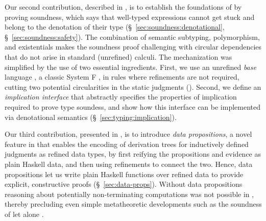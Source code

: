 %
Our second contribution,
described in ,
is to establish the foundations
of \sysrf by proving soundness,
which says that well-typed expressions cannot get stuck
and belong to the denotation of their type 
(\S~\ref{sec:soundness:denotational}, \S~\ref{sec:soundness:safety}).                                   %
%
%
The combination of semantic subtyping, polymorphism,
and existentials makes the soundness proof challenging
with circular dependencies that do not arise in standard
(unrefined) calculi.
%
The mechanization was simplified by the use of
two essential ingredients.
%
First, we use an unrefined \emph{base} language
\sysf, a classic System F \cite{TAPL}, in rules
where refinements are not required, cutting two potential
circularities in the static judgments ().
Second, we define an \emph{implication interface}
that abstractly specifies the properties of implication
required to prove type soundess, and show how this interface
can be implemented via denotational semantics 
(\S~\ref{sec:typing:implication}).                          %

%
Our third contribution,
presented in , is to introduce 
\textit{data propositions}, a novel feature in \lh
that enables the encoding of derivation trees for inductively
defined judgments as refined data types, by first reifying
the propositions and evidence as plain Haskell data, and then
using refinements to connect the two.
%
Hence, data propositions let us write plain Haskell functions
over refined data to provide explicit, 
constructive proofs (\S~\ref{sec:data-props}).              %
%
Without data propositions reasoning about
potentially non-terminating computations was not possible in \lh,
thereby precluding even simple
metatheoretic developments such as the soundness
of \sysf let alone \sysrf.

